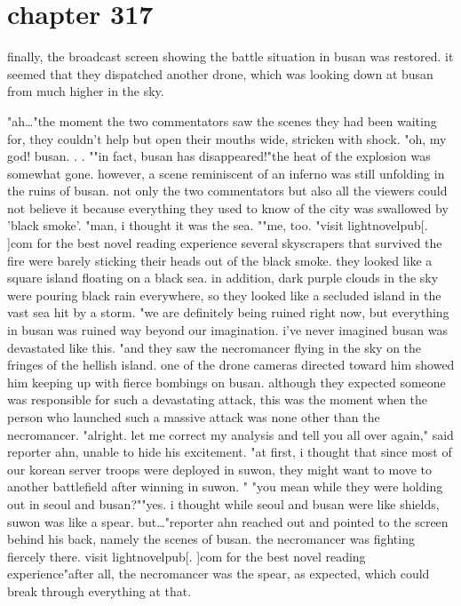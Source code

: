 \section{chapter 317}

finally, the broadcast screen showing the battle situation in busan was restored.
 it seemed that they dispatched another drone, which was looking down at busan from much higher in the sky.





"ah…"the moment the two commentators saw the scenes they had been waiting for, they couldn't help but open their mouths wide, stricken with shock.
"oh, my god! busan.
.
.
""in fact, busan has disappeared!"the heat of the explosion was somewhat gone.
 however, a scene reminiscent of an inferno was still unfolding in the ruins of busan.
 not only the two commentators but also all the viewers could not believe it because everything they used to know of the city was swallowed by 'black smoke'.
"man, i thought it was the sea.
""me, too.
"visit lightnovelpub[.
]com for the best novel reading experience several skyscrapers that survived the fire were barely sticking their heads out of the black smoke.
 they looked like a square island floating on a black sea.
 in addition, dark purple clouds in the sky were pouring black rain everywhere, so they looked like a secluded island in the vast sea hit by a storm.
"we are definitely being ruined right now, but everything in busan was ruined way beyond our imagination.
 i've never imagined busan was devastated like this.
"and they saw the necromancer flying in the sky on the fringes of the hellish island.
one of the drone cameras directed toward him showed him keeping up with fierce bombings on busan.
although they expected someone was responsible for such a devastating attack, this was the moment when the person who launched such a massive attack was none other than the necromancer.
"alright.
 let me correct my analysis and tell you all over again," said reporter ahn, unable to hide his excitement.
 "at first, i thought that since most of our korean server troops were deployed in suwon, they might want to move to another battlefield after winning in suwon.
"
"you mean while they were holding out in seoul and busan?""yes.
 i thought while seoul and busan were like shields, suwon was like a spear.
 but…"reporter ahn reached out and pointed to the screen behind his back, namely the scenes of busan.
 the necromancer was fighting fiercely there.
 visit lightnovelpub[.
]com for the best novel reading experience"after all, the necromancer was the spear, as expected, which could break through everything at that.
